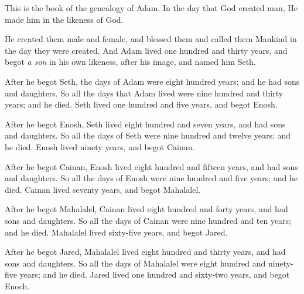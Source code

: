 

\bverse This is the book of the genealogy of Adam. In the day that God created man, He made him in the likeness of God.

\bverse He created them male and female, and blessed them and called them Mankind in the day they were created.
\bverse And Adam lived one hundred and thirty years, and begot \textit{a son} in his own likeness, after his image, and named him Seth.

\bverse After he begot Seth, the days of Adam were eight hundred years; and he had sons and daughters.
\bverse So all the days that Adam lived were nine hundred and thirty years; and he died.
\bverse Seth lived one hundred and five years, and begot Enosh.
	
\bverse After he begot Enosh, Seth lived eight hundred and seven years, and had sons and daughters.	
\bverse So all the days of Seth were nine hundred and twelve years; and he died.
\bverse Enosh lived ninety years, and begot Cainan.
	
\bverse After he begot Cainan, Enosh lived eight hundred and fifteen years, and had sons and daughters.	
\bverse So all the days of Enosh were nine hundred and five years; and he died.
\bverse Cainan lived seventy years, and begot Mahalalel.
	
\bverse After he begot Mahalalel, Cainan lived eight hundred and forty years, and had sons and daughters.	
\bverse So all the days of Cainan were nine hundred and ten years; and he died.
\bverse Mahalalel lived sixty-five years, and begot Jared. 
	
\bverse After he begot Jared, Mahalalel lived eight hundred and thirty years, and had sons and daughters. 
\bverse So all the days of Mahalalel were eight hundred and ninety-five years; and he died.
\bverse Jared lived one hundred and sixty-two years, and begot Enoch.
	

